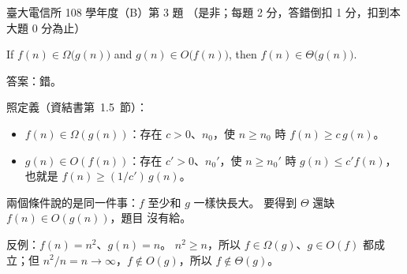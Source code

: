 \begin{pastexam}[label={px:ntu-108-comm-dsab-03}]{臺大電信所 108 學年度（B）第 3 題}
（是非；每題 2 分，答錯倒扣 1 分，扣到本大題 0 分為止）

If $f(n)\in\Omega\big(g(n)\big)$ and $g(n)\in O\big(f(n)\big)$, then $f(n)\in\Theta\big(g(n)\big)$.
\end{pastexam}

\begin{pastsoln}
答案：錯。

照定義（資結書第~1.5~節）：
\begin{itemize}
\item $f(n) \in \Omega(g(n))$：存在 $c > 0$、$n_0$，使 $n \ge n_0$ 時 $f(n) \ge c\, g(n)$。
\item $g(n) \in O(f(n))$：存在 $c' > 0$、$n_0'$，使 $n \ge n_0'$ 時 $g(n) \le c' f(n)$，也就是
$f(n) \ge (1/c')\, g(n)$。
\end{itemize}
兩個條件說的是同一件事：$f$ 至少和 $g$ 一樣快長大。 要得到 $\Theta$ 還缺 $f(n) \in O(g(n))$，題目
沒有給。

反例：$f(n) = n^2$、$g(n) = n$。 $n^2 \ge n$，所以 $f \in \Omega(g)$、$g \in O(f)$ 都成立；但
$n^2 / n = n \to \infty$，$f \notin O(g)$，所以 $f \notin \Theta(g)$。
\end{pastsoln}
